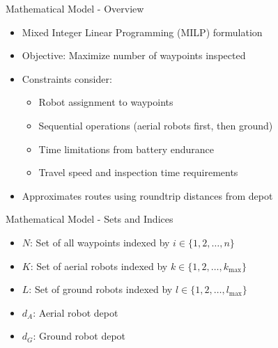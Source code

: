 \documentclass[aspectratio=169,11pt,xcolor={dvipsnames},hyperref={pdftex,pdfpagemode=UseNone,hidelinks,pdfdisplaydoctitle=true},usepdftitle=false]{beamer}
\begin{document}
  \begin{frame}{Mathematical Model - Overview}
    \begin{itemize}
      \item Mixed Integer Linear Programming (MILP) formulation
      \item Objective: Maximize number of waypoints inspected
      \item Constraints consider:
        \begin{itemize}
          \item Robot assignment to waypoints
          \item Sequential operations (aerial robots first, then ground)
          \item Time limitations from battery endurance
          \item Travel speed and inspection time requirements
        \end{itemize}
      \item Approximates routes using roundtrip distances from depot
    \end{itemize}
  \end{frame}

  \begin{frame}{Mathematical Model - Sets and Indices}
    \begin{itemize}
      \item $N$: Set of all waypoints indexed by $i \in \{1, 2, \ldots, n\}$
      \item $K$: Set of aerial robots indexed by $k \in \{1, 2, \ldots, k_{\max}\}$
      \item $L$: Set of ground robots indexed by $l \in \{1, 2, \ldots, l_{\max}\}$
      \item $d_A$: Aerial robot depot
      \item $d_G$: Ground robot depot
    \end{itemize}
  \end{frame}
\end{document}
